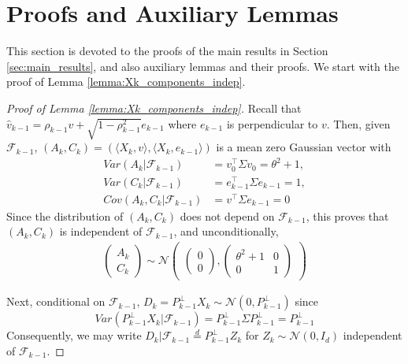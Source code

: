 \documentclass[12pt]{article}
\def\gF{{\mathcal{F}}}
\def\gN{{\mathcal{N}}}
\begin{document}
\section{Proofs and Auxiliary Lemmas}\label{sec:proofs}

This section is devoted to the proofs of the main results in Section \ref{sec:main_results}, and also auxiliary lemmas and their proofs. We start with the proof of Lemma \ref{lemma:Xk_components_indep}.

\medskip

\begin{proof}[Proof of Lemma \ref{lemma:Xk_components_indep}]
    Recall that $\hat v_{k-1}=\rho_{k-1}v+\sqrt{1-\rho^2_{k-1}}e_{k-1}$ where $e_{k-1}$ is perpendicular to $v$. Then, given $\gF_{k-1}$, $(A_k,C_k)=(\langle X_k,v\rangle, \langle X_k,e_{k-1}\rangle)$ is a mean zero Gaussian vector with
    \begin{align*}
        Var(A_k|\gF_{k-1})&=v_0^\top \Sigma v_0 = \theta^2 + 1,\\
        Var(C_k|\gF_{k-1})&=e_{k-1}^\top \Sigma e_{k-1} = 1,\\
        Cov(A_k,C_k|\gF_{k-1})&=v^\top\Sigma e_{k-1}=0
    \end{align*}
    Since the distribution of $(A_k,C_k)$ does not depend on $\gF_{k-1}$, this proves that $(A_k,C_k)$ is independent of $\gF_{k-1}$, and unconditionally,
    \begin{align*}
        \begin{pmatrix}
            A_k\\
            C_k
        \end{pmatrix}\sim \gN\begin{pmatrix}
            \begin{pmatrix}
                0 \\
                0
            \end{pmatrix}, \begin{pmatrix}
                \theta^2+1 & 0 \\
                0 & 1
            \end{pmatrix}
        \end{pmatrix}
    \end{align*}

Next, conditional on $\gF_{k-1}$, $D_k=P_{k-1}^\perp X_k\sim \gN(0, P_{k-1}^\perp)$ since $$Var(P_{k-1}^\perp X_k|\gF_{k-1})=P_{k-1}^\perp\Sigma P_{k-1}^\perp=P_{k-1}^\perp$$Consequently, we may write $D_k|\gF_{k-1}\stackrel{d}{=} P^{\perp}_{k-1}Z_k$ for $Z_k\sim\gN(0,I_d)$ independent of $\gF_{k-1}$.
   

\end{proof}
\end{document}

